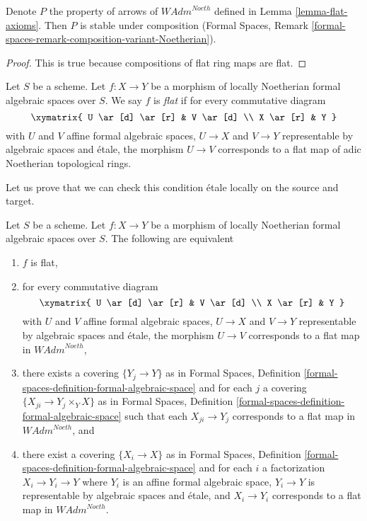 \begin{lemma}
\label{lemma-composition-flat-continuous}
Denote $P$ the property of arrows of $\textit{WAdm}^{Noeth}$
defined in Lemma \ref{lemma-flat-axioms}.
Then $P$ is stable under composition (Formal Spaces, Remark
\ref{formal-spaces-remark-composition-variant-Noetherian}).
\end{lemma}

\begin{proof}
This is true because compositions of flat ring maps are flat.
\end{proof}

\begin{definition}
\label{definition-flat}
Let $S$ be a scheme. Let $f : X \to Y$ be a morphism of locally
Noetherian formal algebraic spaces over $S$. We say $f$ is
{\it flat} if for every commutative diagram
$$
\xymatrix{
U \ar[d] \ar[r] & V \ar[d] \\
X \ar[r] & Y
}
$$
with $U$ and $V$ affine formal algebraic spaces, $U \to X$ and $V \to Y$
representable by algebraic spaces and \'etale, the morphism $U \to V$
corresponds to a flat map of adic Noetherian topological rings.
\end{definition}

\noindent
Let us prove that we can check this condition \'etale locally on the
source and target.

\begin{lemma}
\label{lemma-flat-morphisms}
Let $S$ be a scheme. Let $f : X \to Y$ be a morphism of
locally Noetherian formal algebraic spaces over $S$.
The following are equivalent
\begin{enumerate}
\item $f$ is flat,
\item for every commutative diagram
$$
\xymatrix{
U \ar[d] \ar[r] & V \ar[d] \\
X \ar[r] & Y
}
$$
with $U$ and $V$ affine formal algebraic spaces, $U \to X$ and $V \to Y$
representable by algebraic spaces and \'etale, the morphism $U \to V$
corresponds to a flat map in $\textit{WAdm}^{Noeth}$,
\item there exists a covering $\{Y_j \to Y\}$ as in
Formal Spaces,
Definition \ref{formal-spaces-definition-formal-algebraic-space}
and for each $j$
a covering $\{X_{ji} \to Y_j \times_Y X\}$ as in
Formal Spaces,
Definition \ref{formal-spaces-definition-formal-algebraic-space}
such that each $X_{ji} \to Y_j$  corresponds
to a flat map in $\textit{WAdm}^{Noeth}$, and
\item there exist a covering $\{X_i \to X\}$ as in
Formal Spaces,
Definition \ref{formal-spaces-definition-formal-algebraic-space}
and for each $i$ a factorization $X_i \to Y_i \to Y$ where $Y_i$
is an affine formal algebraic space, $Y_i \to Y$ is representable
by algebraic spaces and \'etale, and $X_i \to Y_i$ corresponds
to a flat map in $\textit{WAdm}^{Noeth}$.
\end{enumerate}
\end{lemma}


